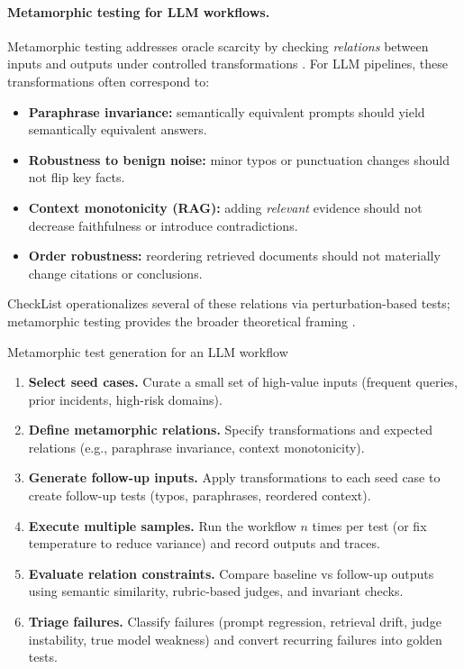 \paragraph{Metamorphic testing for LLM workflows.}
Metamorphic testing addresses oracle scarcity by checking \emph{relations} between inputs and outputs under controlled transformations \cite{chen1998metamorphic}. For LLM pipelines, these transformations often correspond to:
\begin{itemize}
    \item \textbf{Paraphrase invariance:} semantically equivalent prompts should yield semantically equivalent answers.
    \item \textbf{Robustness to benign noise:} minor typos or punctuation changes should not flip key facts.
    \item \textbf{Context monotonicity (RAG):} adding \emph{relevant} evidence should not decrease faithfulness or introduce contradictions.
    \item \textbf{Order robustness:} reordering retrieved documents should not materially change citations or conclusions.
\end{itemize}
CheckList operationalizes several of these relations via perturbation-based tests; metamorphic testing provides the broader theoretical framing \cite{ribeiro2020checklist,chen1998metamorphic}.

\begin{llmalgobox}{Metamorphic test generation for an LLM workflow}
\label{alg:ch10_metamorphic_testing}
\begin{enumerate}[leftmargin=1.6em, itemsep=3pt]
    \item \textbf{Select seed cases.} Curate a small set of high-value inputs (frequent queries, prior incidents, high-risk domains).
    \item \textbf{Define metamorphic relations.} Specify transformations and expected relations (e.g., paraphrase invariance, context monotonicity).
    \item \textbf{Generate follow-up inputs.} Apply transformations to each seed case to create follow-up tests (typos, paraphrases, reordered context).
    \item \textbf{Execute multiple samples.} Run the workflow $n$ times per test (or fix temperature to reduce variance) and record outputs and traces.
    \item \textbf{Evaluate relation constraints.} Compare baseline vs follow-up outputs using semantic similarity, rubric-based judges, and invariant checks.
    \item \textbf{Triage failures.} Classify failures (prompt regression, retrieval drift, judge instability, true model weakness) and convert recurring failures into golden tests.
\end{enumerate}
\end{llmalgobox}

